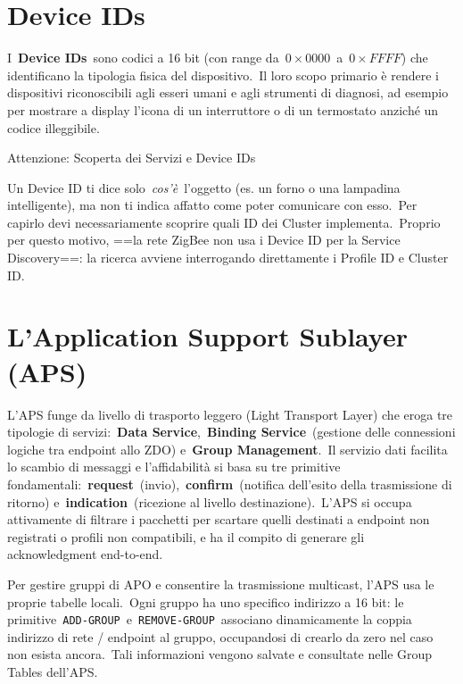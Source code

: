 \documentclass[
  italian,
  openany]{book}
\begin{document}
\section{Device IDs}\label{device-ids}

I~\textbf{Device IDs}~sono codici a 16 bit (con range
da~\(0\times0000\)~a~\(0\times FFFF\)) che identificano la tipologia
fisica del dispositivo.~Il loro scopo primario è rendere i dispositivi
riconoscibili agli esseri umani e agli strumenti di diagnosi, ad esempio
per mostrare a display l'icona di un interruttore o di un termostato
anziché un codice illeggibile.

\begin{calloutwarning}{Attenzione: Scoperta dei Servizi e Device IDs }

Un Device ID ti dice solo~\emph{cos'è}~l'oggetto (es. un forno o una
lampadina intelligente), ma non ti indica affatto come poter comunicare
con esso.~Per capirlo devi necessariamente scoprire quali ID dei Cluster
implementa.~Proprio per questo motivo, ==la rete ZigBee non usa i Device
ID per la Service Discovery==: la ricerca avviene interrogando
direttamente i Profile ID e Cluster ID.

\end{calloutwarning}

\section{L'Application Support Sublayer
(APS)}\label{lapplication-support-sublayer-aps}

L'APS funge da livello di trasporto leggero (Light Transport Layer) che
eroga tre tipologie di servizi:~\textbf{Data Service},~\textbf{Binding
Service}~(gestione delle connessioni logiche tra endpoint allo ZDO)
e~\textbf{Group Management}.~Il servizio dati facilita lo scambio di
messaggi e l'affidabilità si basa su tre primitive
fondamentali:~\textbf{request}~(invio),~\textbf{confirm}~(notifica
dell'esito della trasmissione di ritorno)
e~\textbf{indication}~(ricezione al livello destinazione).~L'APS si
occupa attivamente di filtrare i pacchetti per scartare quelli destinati
a endpoint non registrati o profili non compatibili, e ha il compito di
generare gli acknowledgment end-to-end.

Per gestire gruppi di APO e consentire la trasmissione multicast, l'APS
usa le proprie tabelle locali.~Ogni gruppo ha uno specifico indirizzo a
16 bit: le
primitive~\texttt{ADD-GROUP}~e~\texttt{REMOVE-GROUP}~associano
dinamicamente la coppia indirizzo di rete / endpoint al gruppo,
occupandosi di crearlo da zero nel caso non esista ancora.~Tali
informazioni vengono salvate e consultate nelle Group Tables dell'APS.
\end{document}
